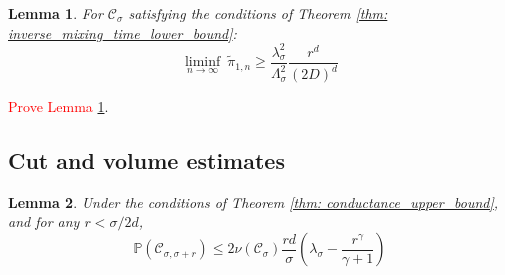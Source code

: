 \documentclass{article}
\newcommand{\1}{\mathbf{1}}
\newcommand{\Pbb}{\mathbb{P}}
\newcommand{\Cset}{\mathcal{C}}
\newcommand{\Csig}{\Cset_{\sigma}}
\newcommand{\Csigr}{\Cset_{\sigma,\sigma + r}}
\theoremstyle{aldenthm}
\newtheorem{lemma}{Lemma}
\begin{document}
\begin{lemma}
	\label{lem: local_spread_lb}
	For $\Csig$ satisfying the conditions of Theorem \ref{thm: inverse_mixing_time_lower_bound}:
	\begin{equation*}
	\liminf_{n \to \infty}~ \widetilde{\pi}_{1,n} \geq \frac{\lambda_{\sigma}^2}{\Lambda_{\sigma}^2} \frac{r^d}{(2D)^d}
	\end{equation*}
\end{lemma}

\textcolor{red}{Prove Lemma \ref{lem: local_spread_lb}}.

\subsection{Cut and volume estimates}
\begin{lemma}
	\label{lem: expected_number_boundary_points}
	Under the conditions of Theorem \ref{thm: conductance_upper_bound}, and for any $r < \sigma/2d$,
	\begin{equation*}
	\Pbb(\Csigr) \leq 2 \nu(\Csig) \frac{rd}{\sigma}  \left(\lambda_{\sigma} - \frac{r^{\gamma}}{\gamma + 1}\right)
	\end{equation*}	
\end{lemma}
\end{document}
